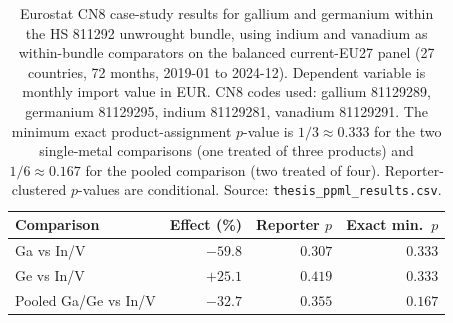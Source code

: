 \begin{table}[H]
\centering
\caption{Eurostat CN8 case-study results for gallium and germanium
within the HS 811292 unwrought bundle, using indium and vanadium as
within-bundle comparators on the balanced current-EU27 panel (27
countries, 72 months, 2019-01 to 2024-12). Dependent variable is monthly
import value in EUR. CN8 codes used: gallium 81129289, germanium
81129295, indium 81129281, vanadium 81129291. The minimum exact
product-assignment $p$-value is $1/3\approx 0.333$ for the two
single-metal comparisons (one treated of three products) and
$1/6\approx 0.167$ for the pooled comparison (two treated of four).
Reporter-clustered $p$-values are conditional. Source:
\texttt{thesis\_ppml\_results.csv}.}
\label{tab:eurostat}
\footnotesize
\begin{tabular}{lrrr}
\toprule
Comparison & Effect (\%) & Reporter $p$ & Exact min.\ $p$ \\
\midrule
Ga vs In/V               & $-59.8$ & $0.307$ & $0.333$ \\
Ge vs In/V               & $+25.1$ & $0.419$ & $0.333$ \\
Pooled Ga/Ge vs In/V     & $-32.7$ & $0.355$ & $0.167$ \\
\bottomrule
\end{tabular}
\end{table}
